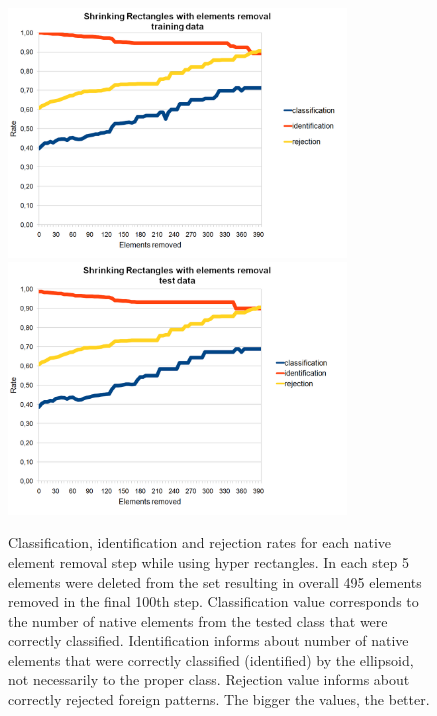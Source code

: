\begin{figure}[htp]
	\centering
	\includegraphics[width=0.80\textwidth]{Figures/charts/DIGITS/DIGITS_ShrinkingRectanglesElementsRemovalTraining.png}
	\hspace{12pt}
	\includegraphics[width=0.80\textwidth]{Figures/charts/DIGITS/DIGITS_ShrinkingRectanglesElementsRemovalTest.png}
	\caption{ Classification, identification and rejection rates for each native element removal step while using hyper rectangles. In each step 5 elements were deleted from the set resulting in overall 495 elements removed in the final 100th step. Classification value corresponds to the number of native elements from the tested class that were correctly classified. Identification informs about number of native elements that were correctly classified (identified) by the ellipsoid, not necessarily to the proper class. Rejection value informs about correctly rejected foreign patterns. The bigger the values, the better. }
	\label{fig:shrinking_rectangles_elements_rejection}\vspace{-3pt}
\end{figure}

